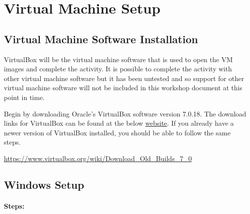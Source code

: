 \documentclass[letterpaper,12pt]{report}
\begin{document}
\clearpage
{}
\settableofcontents
\tableofcontents
\clearpage

\newpage


\section*{Virtual Machine Setup}\label{sec:Virtual-Machine-Setup}

\subsection*{Virtual Machine Software Installation}\label{sec:Virtual-Machine-Software-Installation}

VirtualBox will be the virtual machine software that is used to open the VM images and complete the activity. It is possible to complete the activity with other virtual machine software but it has been untested and so support for other virtual machine software will not be included in this workshop document at this point in time.

Begin by downloading Oracle's VirtualBox software version 7.0.18. The download links for VirtualBox can be found at the below \href{https://www.virtualbox.org/wiki/Download_Old_Builds_7_0}{website}. If you already have a newer version of VirtualBox installed, you should be able to follow the same steps.

\url{https://www.virtualbox.org/wiki/Download_Old_Builds_7_0}

\subsection*{Windows Setup}\label{sec:Virtual-Machine-Windows-Setup}

\paragraph*{Steps:}
\end{document}

